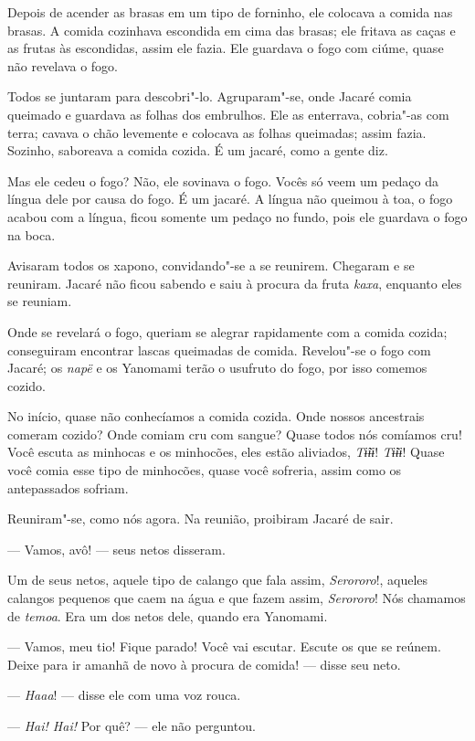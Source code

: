 Depois de acender as brasas em um tipo de forninho, ele colocava a
comida nas brasas. A comida cozinhava escondida em cima das brasas; ele
fritava as caças e as frutas às escondidas, assim ele fazia. Ele
guardava o fogo com ciúme, quase não revelava o fogo. 

Todos se juntaram para descobri"-lo. Agruparam"-se, onde Jacaré comia
queimado e guardava as folhas dos embrulhos. Ele as enterrava, cobria"-as
com terra; cavava o chão levemente e colocava as folhas queimadas; assim
fazia. Sozinho, saboreava a comida cozida. É um jacaré, como a gente
diz.

Mas ele cedeu o fogo? Não, ele sovinava o fogo. Vocês só veem um pedaço
da língua dele por causa do fogo. É um jacaré. A língua não queimou à
toa, o fogo acabou com a língua, ficou somente um pedaço no fundo, pois
ele guardava o fogo na boca. 

Avisaram todos os xapono, convidando"-se a se reunirem. Chegaram e se
reuniram. Jacaré não ficou sabendo e saiu à procura da
fruta \emph{kaxa}, enquanto eles se reuniam. 

Onde se revelará o fogo, queriam se alegrar rapidamente com a comida
cozida; conseguiram encontrar lascas queimadas de comida. Revelou"-se o
fogo com Jacaré; os \emph{napë} e os Yanomami terão o usufruto do fogo,
por isso comemos cozido.

No início, quase não conhecíamos a comida cozida. Onde nossos ancestrais
comeram cozido? Onde comiam cru com sangue? Quase todos nós comíamos
cru! Você escuta as minhocas e os minhocões, eles estão
aliviados, \emph{Tɨ̃ɨɨ}! \emph{Tɨ̃ɨɨ}! Quase você comia esse tipo de
minhocões, quase você sofreria, assim como os antepassados sofriam. 

Reuniram"-se, como nós agora. Na reunião, proibiram Jacaré de sair. 

--- Vamos, avô! --- seus netos disseram. 

Um de seus netos, aquele tipo de calango que fala
assim, \emph{Serororo}!, aqueles calangos pequenos que caem na água e
que fazem assim, \emph{Serororo}! Nós chamamos de \emph{temoa}. Era um
dos netos dele, quando era Yanomami. 

--- Vamos, meu tio! Fique parado! Você vai escutar. Escute os que se
reúnem. Deixe para ir amanhã de novo à procura de comida! --- disse seu
neto. 

--- \emph{Haaa}! --- disse ele com uma voz rouca. 

--- \emph{Hai! Hai!} Por quê? --- ele não perguntou. 

